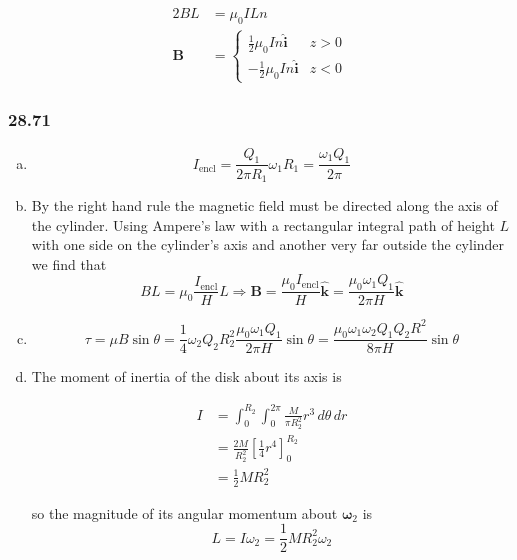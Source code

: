 \documentclass{article}
\begin{document}
\begin{align*}
  2 B L      & = \mu_0 I L n                                                 \\
  \mathbf{B} & = \begin{cases}
                   \frac{1}{2} \mu_0 I n \hat{\mathbf{i}}  & z > 0 \\
                   -\frac{1}{2} \mu_0 I n \hat{\mathbf{i}} & z < 0
                 \end{cases}
\end{align*}

\subsubsection{28.71}

\begin{enumerate}[(a)]
  \item \[I_\text{encl} = \frac{Q_1}{2 \pi R_1} \omega_1 R_1 = \frac{\omega_1 Q_1}{2 \pi}\]

  \item By the right hand rule the magnetic field must be directed along the axis of the cylinder. Using Ampere's law with a rectangular integral path of height $L$ with one side on the cylinder's axis and another very far outside the cylinder we find that \[B L = \mu_0 \frac{I_\text{encl}}{H} L \Rightarrow \mathbf{B} = \frac{\mu_0 I_\text{encl}}{H} \hat{\mathbf{k}} = \frac{\mu_0 \omega_1 Q_1}{2 \pi H} \hat{\mathbf{k}}\]

  \item \[\tau = \mu B \sin \theta = \frac{1}{4} \omega_2 Q_2 R_2^2 \frac{\mu_0 \omega_1 Q_1}{2 \pi H} \sin \theta = \frac{\mu_0 \omega_1 \omega_2 Q_1 Q_2 R^2}{8 \pi H} \sin \theta\]

  \item The moment of inertia of the disk about its axis is

        \begin{align*}
          I & = \int_0^{R_2} \int_0^{2 \pi} \frac{M}{\pi R_2^2} r^3 \,d \theta \,dr \\
            & = \frac{2 M}{R_2^2} \left[ \frac{1}{4} r^4 \right]_0^{R_2}            \\
            & = \frac{1}{2} M R_2^2
        \end{align*}

        so the magnitude of its angular momentum about $\boldsymbol{\omega}_2$ is \[L = I \omega_2 = \frac{1}{2} M R_2^2 \omega_2\]
\end{enumerate}
\end{document}

